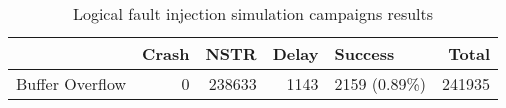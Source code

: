 \begin{table}[t]
\centering
\caption{Logical fault injection simulation campaigns results}
\label{table:end_sim_by_status_wop_single_bitflip_temporel}
\begin{tabular}{lrrrlr}
\toprule
 & Crash & NSTR & Delay & Success & Total \\
\midrule
Buffer Overflow & 0 & 238633 & 1143 & 2159 (0.89\%) & 241935 \\
\bottomrule
\end{tabular}
\end{table}
